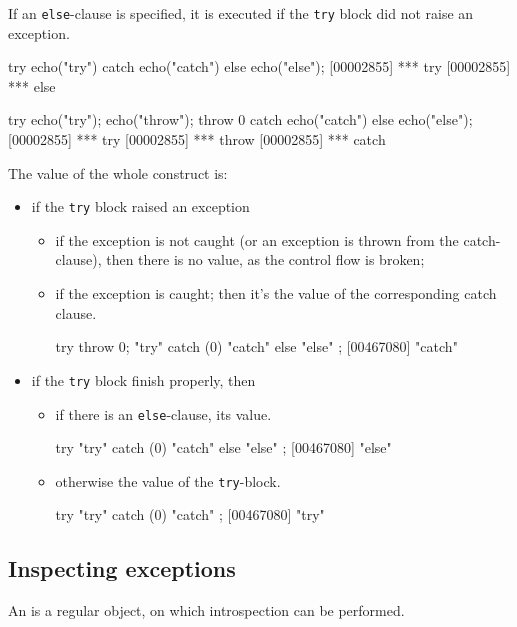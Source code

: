%
If an \lstinline{else}-clause is specified, it is executed if the
\lstinline{try} block did not raise an exception.

\begin{urbiscript}
try   { echo("try") }
catch { echo("catch")}
else  { echo("else")};
[00002855] *** try
[00002855] *** else

try   { echo("try"); echo("throw"); throw 0 }
catch { echo("catch")}
else  { echo("else")};
[00002855] *** try
[00002855] *** throw
[00002855] *** catch
\end{urbiscript}

The value of the whole construct is:
\begin{itemize}
\item if the \lstinline{try} block raised an exception
  \begin{itemize}
  \item if the exception is not caught (or an exception is thrown from the
    catch-clause), then there is no value, as the control flow is broken;
  \item if the exception is caught; then it's the value of the corresponding
    catch clause.
\begin{urbiscript}
try { throw 0; "try" } catch (0) { "catch" } else { "else" };
[00467080] "catch"
\end{urbiscript}
  \end{itemize}
\item if the \lstinline{try} block finish properly, then
  \begin{itemize}
  \item if there is an \lstinline{else}-clause, its value.
\begin{urbiscript}
try { "try" } catch (0) { "catch" } else { "else" };
[00467080] "else"
\end{urbiscript}
  \item otherwise the value of the \lstinline{try}-block.
\begin{urbiscript}
try { "try" } catch (0) { "catch" };
[00467080] "try"
\end{urbiscript}
  \end{itemize}
\end{itemize}


\subsection{Inspecting exceptions}

An  is a regular object, on which introspection
can be performed.

